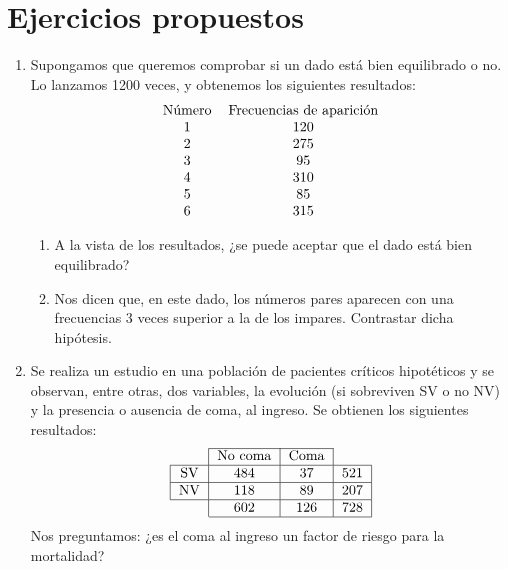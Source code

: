 \section{Ejercicios propuestos}
\begin{enumerate}[leftmargin=*]
\item Supongamos que queremos comprobar si un dado está bien equilibrado o no. Lo lanzamos 1200 veces, y obtenemos los siguientes
resultados:
\[
\begin{tabular}{ll}
\multicolumn{1}{c}{Número} & \multicolumn{1}{c}{Frecuencias de aparición} \\
\multicolumn{1}{c}{1} & \multicolumn{1}{c}{120} \\
\multicolumn{1}{c}{2} & \multicolumn{1}{c}{275} \\
\multicolumn{1}{c}{3} & \multicolumn{1}{c}{95} \\
\multicolumn{1}{c}{4} & \multicolumn{1}{c}{310} \\
\multicolumn{1}{c}{5} & \multicolumn{1}{c}{85} \\
\multicolumn{1}{c}{6} & \multicolumn{1}{c}{315} \\
\end{tabular}
\]
\begin{enumerate}
\item A la vista de los resultados, ¿se puede aceptar que el dado está bien equilibrado?
\item Nos dicen que, en este dado, los números pares aparecen con una frecuencias 3 veces superior a la de los impares. Contrastar dicha
hipótesis.
\end{enumerate}

\item Se realiza un estudio en una población de pacientes críticos hipotéticos y se observan, entre otras, dos variables, la evolución (si
sobreviven SV o no NV) y la presencia o ausencia de coma, al ingreso. Se obtienen los siguientes resultados:
\[
\begin{tabular}{l|l|l|l|}
\cline{2-3}
\multicolumn{1}{c|}{} & \multicolumn{1}{c|}{No coma} & \multicolumn{1}{c|}{Coma} & \multicolumn{1}{c}{} \\
\hline
\multicolumn{1}{|c|}{SV} & \multicolumn{1}{c|}{484} & \multicolumn{1}{c|}{37} & \multicolumn{1}{c|}{521} \\
\hline
\multicolumn{1}{|c|}{NV} & \multicolumn{1}{c|}{118} & \multicolumn{1}{c|}{89} & \multicolumn{1}{c|}{207} \\
\hline
\multicolumn{1}{c|}{} & \multicolumn{1}{c|}{602} & \multicolumn{1}{c|}{126} & \multicolumn{1}{c|}{728} \\
\cline{2-4}
\end{tabular}
\]
Nos preguntamos: ¿es el coma al ingreso un factor de riesgo para la mortalidad?


\end{enumerate}
